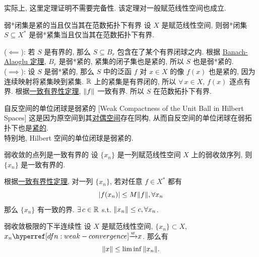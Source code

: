         \begin{rmk}
            [Dedicatia]
            实际上, 这里定理证明不需要完备性. 该定理对一般赋范线性空间也成立.
        \end{rmk}

        \begin{varthm}
            {弱*闭集是紧的当且仅当其在范数拓扑下有界}
            设 \(X\) 是赋范线性空间, 则弱*闭集 \(S\subseteq X^*\) 是弱*紧集当且仅当其在范数拓扑下有界.
        \end{varthm}

        \begin{prf}
            (\(\impliedby\)): 若 \(S\) 是有界的, 那么 \(S\subseteq B_r\) 包含在了某个有界闭球之内. 根据 \hyperref[thm:banach-alaoglu]{Banach-Alaoglu 定理}, \(B_r\) 是弱*紧的, 紧集的闭子集也是紧的, 所以 \(S\) 也是弱*紧的.\\
            (\(\implies\)): 设 \(S\) 是弱*紧的, 那么 \(S\) 中的泛函 \(f\) 对 \(x\in X\) 的像 \(f(x)\) 也是紧的, 因为连续映射将紧集映到紧集. \(\operatorname{\mathbb{R}}\) 上的紧集是有界闭的, 所以 \(\forall\, x\in X\), \(f(x)\) 逐点有界. 根据\hyperref[thm:banach-steinhaus]{一致有界性定理}, \(\norm{f}\) 一致有界. 所以 \(S\) 在范数拓扑下有界.
        \end{prf}

        \begin{crl}
            {自反空间的单位闭球是弱紧的}
            [Weak Compactness of the Unit Ball in Hilbert Spaces]
            这是因为原空间到其\hyperref[dfn:dual-space]{对偶空间}存在同构, 从而自反空间的单位闭球在弱拓扑下也是\hyperref[dfn:compact]{紧的}. \\
            特别地, Hilbert 空间的单位闭球是弱紧的.
        \end{crl}

        \begin{varthm}
            {弱收敛的点列是一致有界的}
            设 $\{x_n\}$ 是一列赋范线性空间 \(X\) 上的弱收敛序列, 则 \(\{x_n\}\) 是一致有界的.
        \end{varthm}

        \begin{prf}
            根据\hyperref[thm:banach-steinhaus]{一致有界性定理}, 对一列 \(\{x_n\}\), 若对任意 \(f\in X^*\) 都有 
            \[|f(x_n)|\leq M\norm{f}, \forall x_n\]
            那么 \(\{x_n\}\) 有一致的界. \(\exists\,c\in\operatorname{\mathbb{R}}\) s.t. \(\norm{x_n}\leq c,\forall x_n\).
        \end{prf}

        \begin{varthm}
            {弱收敛极限的下半连续性}
            设 \(X\) 是赋范线性空间, \(\{x_n\}\subset X\), \(x_n\wlim x\). 那么有
            \[\norm{x}\leq\liminf\norm{x_n}. \]
        \end{varthm}


